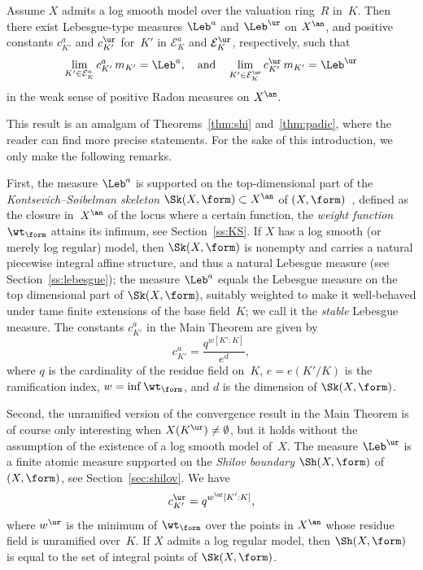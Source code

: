 \begin{theorem*}
Assume $X$ admits a log smooth model over the valuation ring~$R$ in~$K$. Then there exist Lebesgue-type measures $\Leb^a$ and $\Leb^{\ur}$ on $X^{\an}$, and positive constants $c_{K'}^a$ and $c_{K'}^{\ur}$ for~$K'$ in $\mathcal{E}^a_K$ and $\mathcal{E}^{\ur}_K$, respectively, such that
\begin{equation*}
\lim_{K'\in\mathcal{E}^a_K}c_{K'}^a\,m_{K'}=\Leb^a,
\quad\text{and}\quad
\lim_{K'\in\mathcal{E}^{\ur}_K}c^{\ur}_{K'}\,m_{K'}=\Leb^{\ur}
\end{equation*}
in the weak sense of positive Radon measures on $X^{\an}$.
\end{theorem*}
This result is an amalgam of Theorems~\ref{thm:shi} and~\ref{thm:padic}, where the reader can find more precise statements. For the sake of this introduction, we only make the following remarks.

First, the measure $\Leb^a$ is supported on the top-dimensional part of the {\em Kontsevich--Soibelman skeleton} $\Sk(X,\form)\subset X^{\an}$ of $(X,\form)$~\cite{KS,MuNi}, defined as the closure in~$X^{\an}$ of the locus where a certain function, the \emph{weight function} $\wt_\form$ attains its infimum, see Section~\ref{ss:KS}.
If $X$ has a log smooth (or merely log regular) model, then $\Sk(X,\form)$ is nonempty and carries a natural piecewise integral affine structure, and thus a natural Lebesgue measure (see Section~\ref{ss:lebesgue}); the measure $\Leb^a$ equals the Lebesgue measure on the top dimensional part of $\Sk(X,\form)$, suitably
weighted to make it well-behaved under tame finite extensions of the base field~$K$; we call it the \emph{stable} Lebesgue measure. The constants $c_{K'}^a$ in the Main Theorem are given by
\begin{equation*}
c_{K'}^a=\frac{q^{w[K':K]}}{e^d},
\end{equation*}
where $q$ is the cardinality of the residue field on~$K$, $e=e(K'/K)$ is the ramification index, $w=\inf\wt_\form$, and $d$ is the dimension of $\Sk(X,\form)$.

Second, the unramified version of the convergence result in the Main Theorem is of course only interesting when $X(K^{\ur})\ne\emptyset$, but it holds without the assumption of the existence of a log smooth model of~$X$. The measure $\Leb^{\ur}$ is a finite atomic measure supported on the \emph{Shilov boundary} $\Sh(X,\form)$ of $(X,\form)$, see Section~\ref{sec:shilov}.
We have
\begin{equation*}
c_{K'}^{\ur}=q^{w^{\ur}[K':K]},
\end{equation*}
where $w^{\ur}$ is the minimum of $\wt_\form$ over the points in $X^{\an}$ whose residue field is unramified over~$K$.
If $X$ admits a log regular model, then $\Sh(X,\form)$ is equal to
the set of integral points of $\Sk(X,\form)$.


